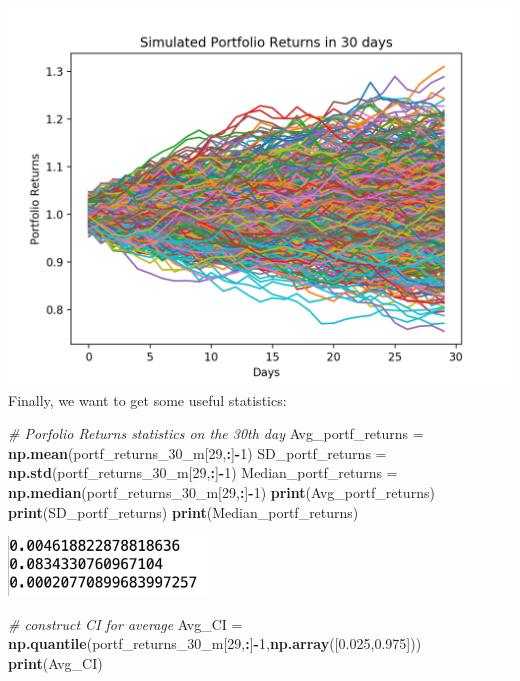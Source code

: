 \documentclass[]{book}
\newenvironment{Shaded}{\begin{snugshade}}{\end{snugshade}}
\newcommand{\CommentTok}[1]{\textcolor[rgb]{0.56,0.35,0.01}{\textit{#1}}}
\newcommand{\DecValTok}[1]{\textcolor[rgb]{0.00,0.00,0.81}{#1}}
\newcommand{\FloatTok}[1]{\textcolor[rgb]{0.00,0.00,0.81}{#1}}
\newcommand{\KeywordTok}[1]{\textcolor[rgb]{0.13,0.29,0.53}{\textbf{#1}}}
\newcommand{\NormalTok}[1]{#1}
\newcommand{\OperatorTok}[1]{\textcolor[rgb]{0.81,0.36,0.00}{\textbf{#1}}}
\newcommand{\StringTok}[1]{\textcolor[rgb]{0.31,0.60,0.02}{#1}}
\begin{document}
\includegraphics{./Stats506/Python_pics/Portf_returns_py.png}
Finally, we want to get some useful statistics:

\begin{Shaded}
\begin{Highlighting}[]
\CommentTok{# Porfolio Returns statistics on the 30th day}
\NormalTok{Avg_portf_returns =}\StringTok{ }\KeywordTok{np.mean}\NormalTok{(portf_returns_}\DecValTok{30}\NormalTok{_m[}\DecValTok{29}\NormalTok{,}\OperatorTok{:}\NormalTok{]}\OperatorTok{-}\DecValTok{1}\NormalTok{)}
\NormalTok{SD_portf_returns =}\StringTok{ }\KeywordTok{np.std}\NormalTok{(portf_returns_}\DecValTok{30}\NormalTok{_m[}\DecValTok{29}\NormalTok{,}\OperatorTok{:}\NormalTok{]}\OperatorTok{-}\DecValTok{1}\NormalTok{)}
\NormalTok{Median_portf_returns =}\StringTok{ }\KeywordTok{np.median}\NormalTok{(portf_returns_}\DecValTok{30}\NormalTok{_m[}\DecValTok{29}\NormalTok{,}\OperatorTok{:}\NormalTok{]}\OperatorTok{-}\DecValTok{1}\NormalTok{)}
\KeywordTok{print}\NormalTok{(Avg_portf_returns)}
\KeywordTok{print}\NormalTok{(SD_portf_returns)}
\KeywordTok{print}\NormalTok{(Median_portf_returns)}
\end{Highlighting}
\end{Shaded}

\includegraphics[width=200px]{./Stats506/Python_pics/avgsdmedian}

\begin{Shaded}
\begin{Highlighting}[]
\CommentTok{# construct CI for average}
\NormalTok{Avg_CI =}\StringTok{ }\KeywordTok{np.quantile}\NormalTok{(portf_returns_}\DecValTok{30}\NormalTok{_m[}\DecValTok{29}\NormalTok{,}\OperatorTok{:}\NormalTok{]}\OperatorTok{-}\DecValTok{1}\NormalTok{,}\KeywordTok{np.array}\NormalTok{([}\FloatTok{0.025}\NormalTok{,}\FloatTok{0.975}\NormalTok{]))}
\KeywordTok{print}\NormalTok{(Avg_CI)}
\end{Highlighting}
\end{Shaded}
\end{document}
